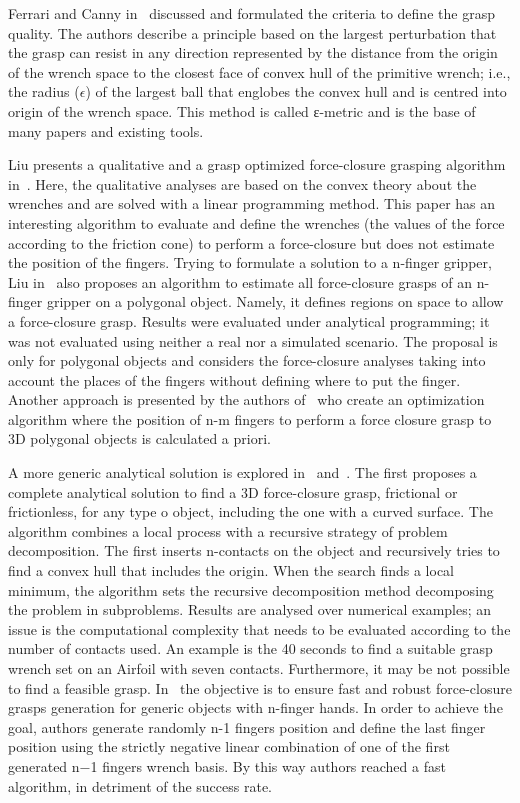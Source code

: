Ferrari and Canny in~\cite{ferrari1992planning} discussed and formulated the criteria to define the grasp quality. The authors describe a principle based on the largest perturbation that the grasp can resist in any direction represented by the distance from the origin of the wrench space to the closest face of convex hull of the primitive wrench; i.e., the radius ($\epsilon$) of the largest ball that englobes the convex hull and is centred into origin of the wrench space. This method is called ε-metric and is the base of many papers and existing tools.

Liu presents a qualitative and a grasp optimized force-closure grasping algorithm in~\cite{liu1999qualitative}. Here, the qualitative analyses are based on the convex theory about the wrenches and are solved with a linear programming method. This paper has an interesting algorithm to evaluate and define the wrenches (the values of the force according to the friction cone) to perform a force-closure but does not estimate the position of the fingers. Trying to formulate a solution to a n-finger gripper, Liu in~\cite{liu2000computing} also proposes an algorithm to estimate all force-closure grasps of an n-finger gripper on a polygonal object. Namely, it defines regions on space to allow a force-closure grasp. Results were evaluated under analytical programming; it was not evaluated using neither a real nor a simulated scenario. The proposal is only for polygonal objects and considers the force-closure analyses taking into account the places of the fingers without defining where to put the finger. Another approach is presented by the authors of~\cite{ding2000computing} who create an optimization algorithm where the position of n-m fingers to perform a force closure grasp to 3D polygonal objects is calculated a priori. 

A more generic analytical solution is explored in~\cite{liu2004complete} and~\cite{el2009computing}. The first proposes a complete analytical solution to find a 3D force-closure grasp, frictional or frictionless, for any type o object, including the one with a curved surface. The algorithm combines a local process with a recursive strategy of problem decomposition. The first inserts n-contacts on the object and recursively tries to find a convex hull that includes the origin. When the search finds a local minimum, the algorithm sets the recursive decomposition method decomposing the problem in subproblems. Results are analysed over numerical examples; an issue is the computational complexity that needs to be evaluated according to the number of contacts used. An example is the 40 seconds to find a suitable grasp wrench set on an Airfoil with seven contacts. Furthermore, it may be not possible to find a feasible grasp. In~\cite{el2009computing} the objective is to ensure fast and robust force-closure grasps generation for generic objects with n-finger hands. In order to achieve the goal, authors generate randomly n-1 fingers position and define the last finger position using the strictly negative linear combination of one of the first generated n−1 fingers wrench basis. By this way  authors reached a fast algorithm, in detriment of the success rate.

